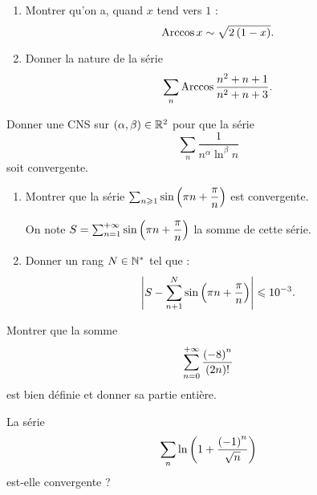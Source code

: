 \begin{exo}
\begin{enumerate}
\item Montrer qu'on a, quand \(x\) tend vers \(1\) : \[\operatorname{Arccos} x\sim\sqrt{2\left(1-x\right)}.\]

\item Donner la nature de la série \[\sum_n\operatorname{Arccos}\dfrac{n^2+n+1}{n^2+n+3}.\]
\end{enumerate}
\end{exo}

\begin{corr}
\end{corr}

\begin{exo}
Donner une CNS sur \(\left(\alpha,\beta\right)\in\mathbb{R}^2\) pour que la série \[\sum_n\dfrac{1}{n^{\alpha}\ln^\beta n}\] soit convergente.
\end{exo}

\begin{corr}
\end{corr}

\begin{exo}[Exercice 7]
\begin{enumerate}
\item Montrer que la série \(\sum_{n\geqslant1}\sin\left(\pi n+\dfrac{\pi}{n}\right)\) est convergente.

On note \(S=\sum_{n=1}^{+\infty}\sin\left(\pi n+\dfrac{\pi}{n}\right)\) la somme de cette série. \\

\item Donner un rang \(N\in\mathbb{N}^*\) tel que : \[\left\lvert S-\sum_{n+1}^N\sin\left(\pi n+\dfrac{\pi}{n}\right)\right\rvert\leqslant10^{-3}.\]
\end{enumerate}
\end{exo}

\begin{corr}
\end{corr}

\begin{exo}[Exercice 8]
Montrer que la somme \[\sum_{n=0}^{+\infty}\dfrac{\left(-8\right)^n}{\left(2n\right)!}\] est bien définie et donner sa partie entière.
\end{exo}

\begin{corr}
\end{corr}

\begin{exo}
La série \[\sum_n\ln\left(1+\dfrac{\left(-1\right)^n}{\sqrt{n}}\right)\] est-elle convergente ?
\end{exo}

